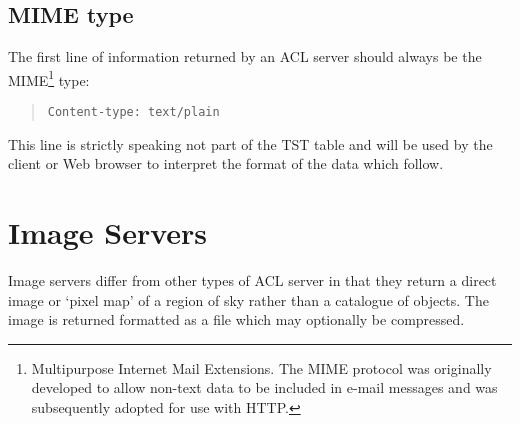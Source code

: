 \documentclass[twoside,11pt,nolof,chapters]{starlink}
\begin{document}
\subsection{\label{MIME_R}MIME type}

The first line of information returned by an ACL server should always
be the MIME\footnote{Multipurpose Internet Mail Extensions.  The MIME
protocol was originally developed to allow non-text data to be included
in e-mail messages and was subsequently adopted for use with HTTP.} type:

\begin{quote}
\texttt{Content-type: text/plain}
\end{quote}

This line is strictly speaking not part of the TST table and will be
used by the client or Web browser to interpret the format of the data
which follow.


\section{\label{IMAGE_R}Image Servers}

Image servers differ from other types of ACL server in that they return
a direct image or `pixel map' of a region of sky rather than a catalogue
of objects.  The image is returned formatted as a
file which may optionally be compressed.
\end{document}

